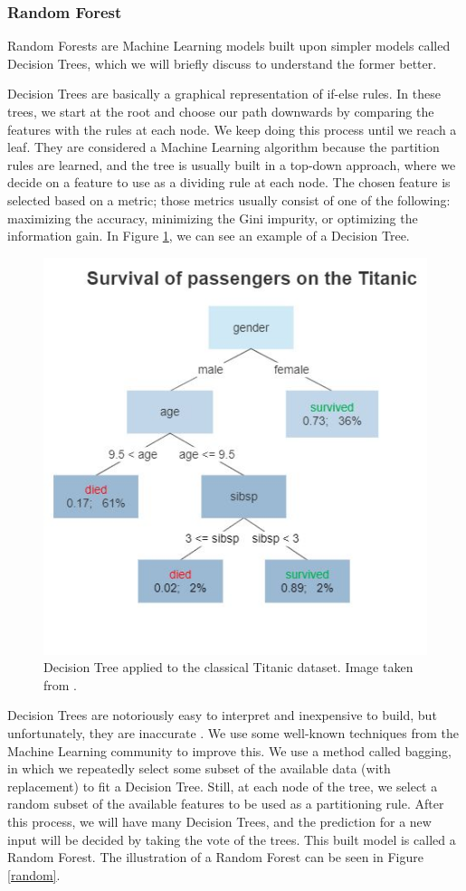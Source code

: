 \subsubsection{Random Forest}
Random Forests are Machine Learning models built upon simpler models called Decision Trees, which we will briefly discuss to understand the former better.

Decision Trees are basically a graphical representation of if-else rules. In these trees, we start at the root and choose our path downwards by comparing the features with the rules at each node. We keep doing this process until we reach a leaf. They are considered a Machine Learning algorithm because the partition rules are learned, and the tree is usually built in a top-down approach, where we decide on a feature to use as a dividing rule at each node. The chosen feature is selected based on a metric; those metrics usually consist of one of the following: maximizing the accuracy, minimizing the Gini impurity, or optimizing the information gain. In Figure \ref{decision}, we can see an example of a Decision Tree.

\begin{figure}[H]
    \includegraphics[width=.7\textwidth]{Cap2-Methods/Decision_Tree.jpg}
    \centering
	\caption{Decision Tree applied to the classical Titanic dataset. Image taken from \cite{decisionimg}.}
	\label{decision}
\end{figure}

Decision Trees are notoriously easy to interpret and inexpensive to build, but unfortunately, they are inaccurate \cite{elements}. We use some well-known techniques from the Machine Learning community to improve this. We use a method called bagging, in which we repeatedly select some subset of the available data (with replacement) to fit a Decision Tree. Still, at each node of the tree, we select a random subset of the available features to be used as a partitioning rule. After this process, we will have many Decision Trees, and the prediction for a new input will be decided by taking the vote of the trees. This built model is called a Random Forest. The illustration of a Random Forest can be seen in Figure \ref{random}.

